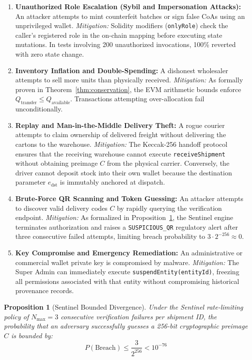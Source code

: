 \documentclass[pdflatex,sn-mathphys-num]{sn-jnl}
\theoremstyle{thmstyleone}
\newtheorem{proposition}[theorem]{Proposition}
\theoremstyle{thmstyletwo}
\theoremstyle{thmstylethree}
\begin{document}
\begin{enumerate}[label=(\alph*)]
    \item \textbf{Unauthorized Role Escalation (Sybil and Impersonation Attacks):} An attacker attempts to mint counterfeit batches or sign false CoAs using an unprivileged wallet. \textit{Mitigation:} Solidity modifiers (\texttt{onlyRole}) check the caller's registered role in the on-chain mapping before executing state mutations. In tests involving 200 unauthorized invocations, 100\% reverted with zero state change.
    \item \textbf{Inventory Inflation and Double-Spending:} A dishonest wholesaler attempts to sell more units than physically received. \textit{Mitigation:} As formally proven in Theorem~\ref{thm:conservation}, the EVM arithmetic bounds enforce $Q_{\text{transfer}} \le Q_{\text{available}}$. Transactions attempting over-allocation fail unconditionally.
    \item \textbf{Replay and Man-in-the-Middle Delivery Theft:} A rogue courier attempts to claim ownership of delivered freight without delivering the cartons to the warehouse. \textit{Mitigation:} The Keccak-256 handoff protocol ensures that the receiving warehouse cannot execute \texttt{receiveShipment} without obtaining preimage $C$ from the physical carrier. Conversely, the driver cannot deposit stock into their own wallet because the destination parameter $e_{\text{dst}}$ is immutably anchored at dispatch.
    \item \textbf{Brute-Force QR Scanning and Token Guessing:} An attacker attempts to discover valid delivery codes $C$ by rapidly querying the verification endpoint. \textit{Mitigation:} As formalized in Proposition~\ref{prop:sentinel-mitigation}, the Sentinel engine terminates authorization and raises a \texttt{SUSPICIOUS\_QR} regulatory alert after three consecutive failed attempts, limiting breach probability to $3 \cdot 2^{-256} \approx 0$.
    \item \textbf{Key Compromise and Emergency Remediation:} An administrative or commercial wallet private key is compromised by malware. \textit{Mitigation:} The Super Admin can immediately execute \texttt{suspendEntity(entityId)}, freezing all permissions associated with that entity without compromising historical provenance records.
\end{enumerate}

\begin{proposition}[Sentinel Bounded Divergence]\label{prop:sentinel-mitigation}
Under the Sentinel rate-limiting policy of $N_{\max} = 3$ consecutive verification failures per shipment ID, the probability that an adversary successfully guesses a 256-bit cryptographic preimage $C$ is bounded by:
\begin{equation}
P(\text{Breach}) \le \frac{3}{2^{256}} < 10^{-76}
\end{equation}
\end{proposition}
\end{document}
